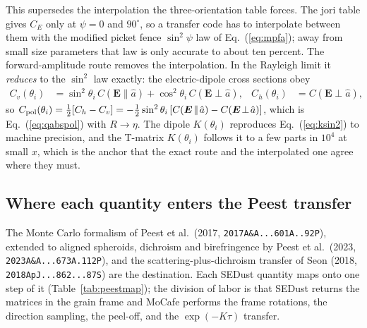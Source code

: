 \documentclass{my_memo}
\let\mathbf\boldsymbol
\newcommand{\code}[1]{\texttt{#1}}
\newcommand{\Cpol}{\ensuremath{C_{\rm pol}}}
\begin{document}
This supersedes the interpolation the three-orientation table forces. The jori
table gives $C_E$ only at $\psi = 0$ and $90^\circ$, so a transfer code has to
interpolate between them with the modified picket fence $\sin^2\psi$ law of
Eq.~(\ref{eq:mpfa}); away from small size parameters that law is only accurate to
about ten percent. The forward-amplitude route removes the interpolation. In the
Rayleigh limit it \emph{reduces} to the $\sin^2$ law exactly: the electric-dipole
cross sections obey
\begin{align}
  C_v(\theta_i) &= \sin^2\theta_i\,C(\mathbf{E}\!\parallel\!\hat a)
                 + \cos^2\theta_i\,C(\mathbf{E}\!\perp\!\hat a), &
  C_h(\theta_i) &= C(\mathbf{E}\!\perp\!\hat a),
  \label{eq:ksin2}
\end{align}
so $\Cpol(\theta_i) = \tfrac12[C_h - C_v] = -\tfrac12\sin^2\theta_i\,
[C(\mathbf{E}\!\parallel\!\hat a) - C(\mathbf{E}\!\perp\!\hat a)]$, which is
Eq.~(\ref{eq:qabspol}) with $R\to\eta$. The dipole $K(\theta_i)$ reproduces
Eq.~(\ref{eq:ksin2}) to machine precision, and the T-matrix $K(\theta_i)$ follows
it to a few parts in $10^4$ at small $x$, which is the anchor that the exact route
and the interpolated one agree where they must.

\subsection{Where each quantity enters the Peest transfer}
\label{sec:alignedscat:map}

The Monte Carlo formalism of Peest et al.\ (2017, \code{2017A\&A...601A..92P}),
extended to aligned spheroids, dichroism and birefringence by Peest et al.\
(2023, \code{2023A\&A...673A.112P}), and the scattering-plus-dichroism transfer of
Seon (2018, \code{2018ApJ...862...87S}) are the destination. Each SEDust quantity
maps onto one step of it (Table~\ref{tab:peestmap}); the division of labor is that
SEDust returns the matrices in the grain frame and MoCafe performs the frame
rotations, the direction sampling, the peel-off, and the $\exp(-K\tau)$ transfer.
\end{document}
